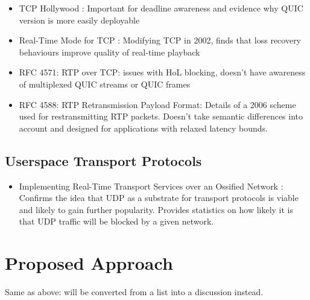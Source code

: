 \documentclass{mprop}
\begin{document}
\begin{itemize}
  \item TCP Hollywood \cite{McQuistin2016}: Important for deadline awareness and evidence why 
  QUIC version is more easily deployable

  \item Real-Time Mode for TCP \cite{Liang2002}: Modifying TCP in 2002, finds that loss recovery 
  behaviours improve quality of real-time playback

  \item RFC 4571: RTP over TCP: issues with HoL blocking, doesn't have awareness of multiplexed 
  QUIC streams or QUIC frames

  \item RFC 4588: RTP Retransmission Payload Format: Details of a 2006 scheme used for 
  restransmitting RTP packets. Doesn't take semantic differences into account and designed for 
  applications with relaxed latency bounds.
\end{itemize}

\subsection{Userspace Transport Protocols}

\begin{itemize}
  \item Implementing Real-Time Transport Services over an Ossified Network 
  \cite {McQuistin2016Ossification}: Confirms the idea that UDP as a substrate for transport 
  protocols is viable and likely to gain further popularity. Provides statistics on how likely it 
  is that UDP traffic will be blocked by a given network.
\end{itemize}

\newpage

\section{Proposed Approach}


Same as above: will be converted from a list into a discussion instead.
\end{document}
